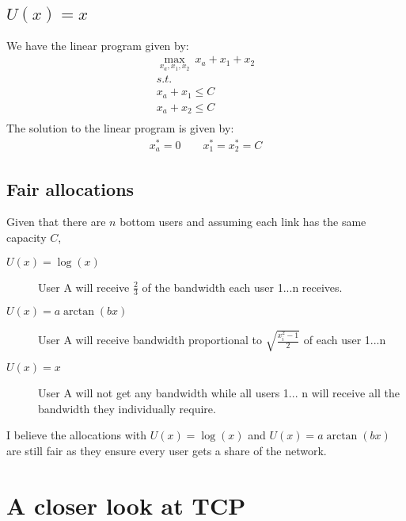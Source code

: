 \documentclass[]{article}
\begin{document}
\subsection{$U(x) = x$}

We have the linear program given by:
\begin{gather*}
\underset{x_a, x_1, x_2}{\max}\ x_a + x_1 + x_2 \\
s.t. \\
x_a + x_1 \leq C \\
x_a + x_2 \leq C \\
\end{gather*}
The solution to the linear program is given by:
\begin{gather*}
x_a^* = 0 \qquad x_1^* = x_2^* = C
\end{gather*}

\subsection{Fair allocations}

Given that there are $n$ bottom users and assuming each link has the same capacity $C$,
\begin{description}
\item[$U(x) = \log(x)$] User A will receive $\frac{2}{3}$ of the bandwidth each user 1...n receives.
\item[$U(x) = a \arctan (bx)$] User A will receive bandwidth proportional to $\sqrt{\frac{x_i^2 - 1}{2}}$ of each user 1...n
\item[$U(x) = x$] User A will not get any bandwidth while all users 1... n will receive all the bandwidth they individually require.
\end{description}

I believe the allocations with $U(x) = \log(x)$ and $U(x) = a \arctan (bx)$ are still fair as they ensure every user gets a share of the network.


\section{A closer look at TCP}
\end{document}
